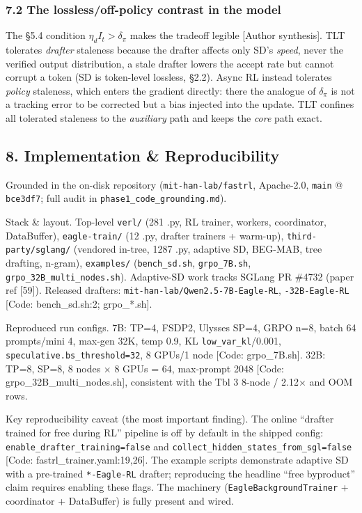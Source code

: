 \documentclass[
  11pt,
  letterpaper,
]{article}
\begin{document}
\subsubsection{7.2 The lossless/off-policy contrast in the
model}\label{the-losslessoff-policy-contrast-in-the-model}

The §5.4 condition \(\eta_d I_t>\delta_\pi\) makes the tradeoff legible
{[}Author synthesis{]}. TLT tolerates \emph{drafter} staleness because
the drafter affects only SD's \emph{speed}, never the verified output
distribution, a stale drafter lowers the accept rate but cannot corrupt
a token (SD is token-level lossless, §2.2). Async RL instead tolerates
\emph{policy} staleness, which enters the gradient directly: there the
analogue of \(\delta_\pi\) is not a tracking error to be corrected but a
bias injected into the update. TLT confines all tolerated staleness to
the \emph{auxiliary} path and keeps the \emph{core} path exact.

\subsection{8. Implementation \&
Reproducibility}\label{implementation-reproducibility}

Grounded in the on-disk repository (\texttt{mit-han-lab/fastrl},
Apache-2.0, \texttt{main} @ \texttt{bce3df7}; full audit in
\texttt{phase1\_code\_grounding.md}).

Stack \& layout. Top-level \texttt{verl/} (281 .py, RL trainer, workers,
coordinator, DataBuffer), \texttt{eagle-train/} (12 .py, drafter
trainers + warm-up), \texttt{third-party/sglang/} (vendored in-tree,
1287 .py, adaptive SD, BEG-MAB, tree drafting, n-gram),
\texttt{examples/} (\texttt{bench\_sd.sh}, \texttt{grpo\_7B.sh},
\texttt{grpo\_32B\_multi\_nodes.sh}). Adaptive-SD work tracks SGLang PR
\#4732 (paper ref {[}59{]}). Released drafters:
\texttt{mit-han-lab/Qwen2.5-7B-Eagle-RL}, \texttt{-32B-Eagle-RL}
{[}Code: bench\_sd.sh:2; grpo\_*.sh{]}.

Reproduced run configs. 7B: TP=4, FSDP2, Ulysses SP=4, GRPO n=8, batch
64 prompts/mini 4, max-gen 32K, temp 0.9, KL
\texttt{low\_var\_kl}/0.001, \texttt{speculative.bs\_threshold=32}, 8
GPUs/1 node {[}Code: grpo\_7B.sh{]}. 32B: TP=8, SP=8, 8 nodes × 8 GPUs =
64, max-prompt 2048 {[}Code: grpo\_32B\_multi\_nodes.sh{]}, consistent
with the Tbl 3 8-node / 2.12× and OOM rows.

Key reproducibility caveat (the most important finding). The online
``drafter trained for free during RL'' pipeline is off by default in the
shipped config: \texttt{enable\_drafter\_training=false} and
\texttt{collect\_hidden\_states\_from\_sgl=false} {[}Code:
fastrl\_trainer.yaml:19,26{]}. The example scripts demonstrate adaptive
SD with a pre-trained \texttt{*-Eagle-RL} drafter; reproducing the
headline ``free byproduct'' claim requires enabling these flags. The
machinery (\texttt{EagleBackgroundTrainer} + coordinator + DataBuffer)
is fully present and wired.
\end{document}
